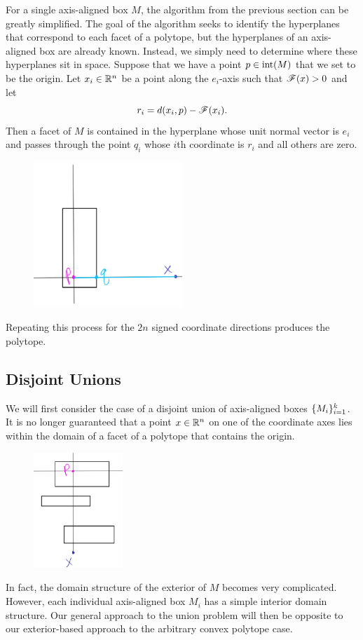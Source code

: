 \documentclass[12pt]{article}
\begin{document}
\begin{flushleft}
For a single axis-aligned box $M$, the algorithm from the previous section can be greatly simplified.
The goal of the algorithm seeks to identify the hyperplanes that correspond to each facet of a polytope, but the hyperplanes of an axis-aligned box are already known.
Instead, we simply need to determine where these hyperplanes sit in space.
Suppose that we have a point $p\in \text{int}(M)$ that we set to be the origin.
Let $x_i\in\mathbb{R}^n$ be a point along the $e_i$-axis such that $\mathscr{F}(x)>0$ and let
\[r_i = d(x_i, p) - \mathscr{F}(x_i).\]
Then a facet of $M$ is contained in the hyperplane whose unit normal vector is $e_i$ and passes through the point $q_i$ whose $i$th coordinate is $r_i$ and all others are zero.
\begin{figure}[H]
	\centering
	\includegraphics[width=0.5\textwidth]{single_box.png}
\end{figure}
Repeating this process for the $2n$ signed coordinate directions produces the polytope.


\subsection{Disjoint Unions}

We will first consider the case of a disjoint union of axis-aligned boxes $\{M_i\}_{i=1}^k$.
It is no longer guaranteed that a point $x\in\mathbb{R}^n$ on one of the coordinate axes lies within the domain of a facet of a polytope that contains the origin.
\begin{figure}[H]
	\centering
	\includegraphics[width=0.3\textwidth]{disjoint_boxes.png}
\end{figure}
In fact, the domain structure of the exterior of $M$ becomes very complicated. 
However, each individual axis-aligned box $M_i$ has a simple interior domain structure.
Our general approach to the union problem will then be opposite to our exterior-based approach to the arbitrary convex polytope case.


\end{flushleft}
\end{document}
